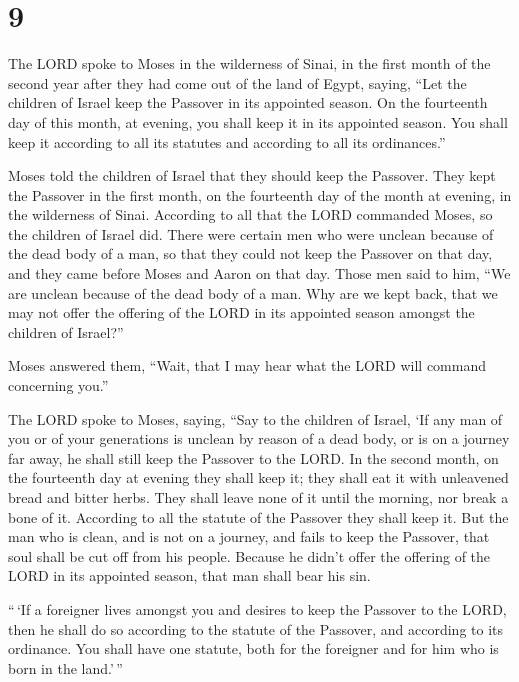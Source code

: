 \hypertarget{section-8}{%
\section{9}\label{section-8}}

 The LORD spoke to Moses in the wilderness of Sinai, in the
first month of the second year after they had come out of the land of
Egypt, saying,  ``Let the children of Israel keep the
Passover in its appointed season.  On the fourteenth day of
this month, at evening, you shall keep it in its appointed season. You
shall keep it according to all its statutes and according to all its
ordinances.''

 Moses told the children of Israel that they should keep the
Passover.  They kept the Passover in the first month, on the
fourteenth day of the month at evening, in the wilderness of Sinai.
According to all that the LORD commanded Moses, so the children of
Israel did.  There were certain men who were unclean because
of the dead body of a man, so that they could not keep the Passover on
that day, and they came before Moses and Aaron on that day. 
Those men said to him, ``We are unclean because of the dead body of a
man. Why are we kept back, that we may not offer the offering of the
LORD in its appointed season amongst the children of Israel?''

 Moses answered them, ``Wait, that I may hear what the LORD
will command concerning you.''

 The LORD spoke to Moses, saying,  ``Say to the
children of Israel, `If any man of you or of your generations is unclean
by reason of a dead body, or is on a journey far away, he shall still
keep the Passover to the LORD.  In the second month, on the
fourteenth day at evening they shall keep it; they shall eat it with
unleavened bread and bitter herbs.  They shall leave none
of it until the morning, nor break a bone of it. According to all the
statute of the Passover they shall keep it.  But the man
who is clean, and is not on a journey, and fails to keep the Passover,
that soul shall be cut off from his people. Because he didn't offer the
offering of the LORD in its appointed season, that man shall bear his
sin.

 ``\,`If a foreigner lives amongst you and desires to keep
the Passover to the LORD, then he shall do so according to the statute
of the Passover, and according to its ordinance. You shall have one
statute, both for the foreigner and for him who is born in the
land.'\,''

